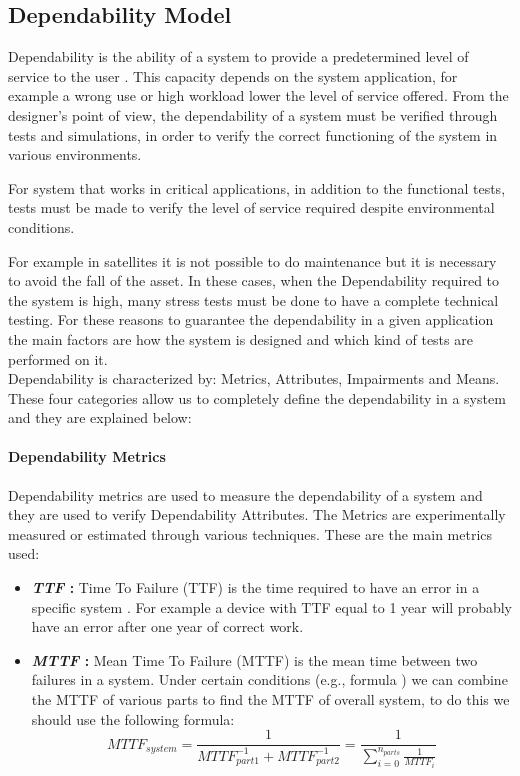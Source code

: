 {{		\subsection{Dependability Model}{
			Dependability is the ability of a system to provide a predetermined level of service to the user . This capacity depends on the system application, for example a wrong use or high workload lower the level of service offered. 
			From the designer's point of view, the dependability of a system must be verified through tests and simulations, in order to verify the correct functioning of the system in various environments.
			
			For system that works in critical applications, in addition to the functional tests, tests must be made to verify the level of service required despite environmental conditions. 
			
			For example in satellites it is not possible to do maintenance but it is necessary to avoid the fall of the asset. In these cases, when the Dependability required to the system is high, many stress tests must be done to have a complete technical testing. For these reasons to guarantee the dependability in a given application the main factors are how the system is designed and which kind of tests are performed on it.\\
			
			Dependability is characterized by: Metrics, Attributes, Impairments and Means. These four categories allow us to completely define the dependability in a system and they are explained below:
			\paragraph{Dependability Metrics}{
				Dependability metrics are used to measure the dependability of a system and they are used to verify Dependability Attributes. The Metrics are experimentally measured or estimated through various techniques. These are the main metrics used: 
				\begin{itemize}
					\item \textbf{\textit{TTF} : } Time To Failure (TTF) is the time required to have an error in a specific system . For example a device with TTF equal to 1 year will probably have an error after one year of correct work.
		
					\item \textbf{\textit{MTTF} : } Mean Time To Failure (MTTF) is the mean time between two failures in a system. Under certain conditions (e.g., formula ) we can combine the MTTF of various parts to find the MTTF of overall system, to do this we should use the following formula:
					\begin{equation}
						MTTF_{system} = \dfrac{1}{MTTF_{part1}^{-1} + MTTF_{part2}^{-1}} = \dfrac{1}{\sum\limits_{i=0}^{n_{parts}}\frac{1}{MTTF_i}}
					\end{equation} 		
					

\end{itemize}}}}}
